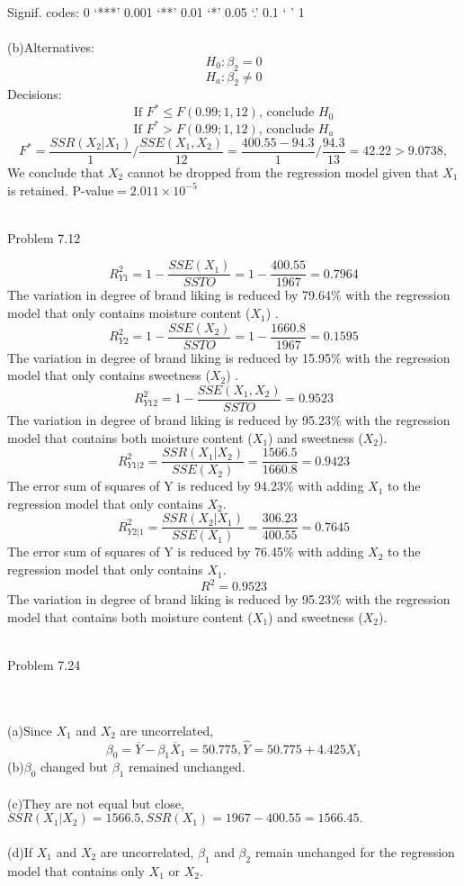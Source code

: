 \documentclass{article}
\begin{document}
Signif. codes:  0 ‘***’ 0.001 ‘**’ 0.01 ‘*’ 0.05 ‘.’ 0.1 ‘ ’ 1
\\\\(b)Alternatives:\[H_0:\beta_2=0\]
\[H_a:\beta_2\neq0\]
Decisions:\[\text{If $F^*\leq F(0.99;1,12)$, conclude $H_0$}\]
   \[\text{If $F^*>F(0.99;1,12)$, conclude $H_a$}\]
   \[F^*=\frac{SSR(X_2|X_1)}{1}/\frac{SSE(X_1,X_2)}{12}=\frac{400.55-94.3}{1}/\frac{94.3}{13}=42.22>9.0738,\]
   We conclude that $X_2$ cannot be dropped from the regression model given that $X_1$ is retained. P-value$=2.011\times 10^{-5}$
   \\\\\begin{large}Problem 7.12\end{large}
   \[R^2_{Y1}=1-\frac{SSE(X_1)}{SSTO}=1-\frac{400.55}{1967}=0.7964\]
   The variation in degree of brand liking is reduced by 79.64\% with the regression model that only contains moisture content ($X_1$) .
   \[R^2_{Y2}=1-\frac{SSE(X_2)}{SSTO}=1-\frac{1660.8}{1967}=0.1595\]
   The variation in degree of brand liking is reduced by 15.95\% with the regression model that only contains sweetness ($X_2$) .
   \[R^2_{Y12}=1-\frac{SSE(X_1,X_2)}{SSTO}=0.9523\]
   The variation in degree of brand liking is reduced by 95.23\% with the regression model that contains both moisture content ($X_1$) and sweetness ($X_2$).
   \[R^2_{Y1|2}=\frac{SSR(X_1|X_2)}{SSE(X_2)}=\frac{1566.5}{1660.8}=0.9423\]
   The error sum of squares of Y is reduced by 94.23\% with adding $X_1$ to the regression model that only contains $X_2$.
   \[R^2_{Y2|1}=\frac{SSR(X_2|X_1)}{SSE(X_1)}=\frac{306.23}{400.55}=0.7645\]
      The error sum of squares of Y is reduced by 76.45\% with adding $X_2$ to the regression model that only contains $X_1$.
   \[R^2=0.9523\]
   The variation in degree of brand liking is reduced by 95.23\% with the regression model that contains both moisture content ($X_1$) and sweetness ($X_2$).
   \\\\\begin{large}Problem 7.24\end{large}
   \\\\(a)Since $X_1$ and $X_2$ are uncorrelated, \[\beta_0=\overline Y-\beta_1\overline X_1=50.775,\hat Y=50.775+4.425X_1\]
   (b)$\beta_0$ changed but $\beta_1$ remained unchanged.
   \\\\(c)They are not equal but close, $SSR(X_1|X_2)=1566.5, SSR(X_1)=1967-400.55=1566.45.$
  \\\\ (d)If $X_1$ and $X_2$ are uncorrelated, $\beta_1$ and $\beta_2$ remain unchanged for the regression model that contains only $X_1$ or $X_2$.
\end{document}
